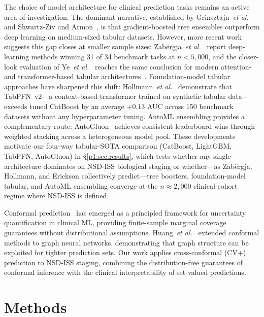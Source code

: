 The choice of model architecture for clinical prediction tasks remains an active area of investigation. The dominant narrative, established by Grinsztajn~\textit{et al.}~\cite{grinsztajn2022} and Shwartz-Ziv and Armon~\cite{shwartzziv2022}, is that gradient-boosted tree ensembles outperform deep learning on medium-sized tabular datasets. However, more recent work suggests this gap closes at smaller sample sizes: Zab\"{e}rgja~\textit{et al.}~\cite{zabergja2024dltabular} report deep-learning methods winning 31 of 34 benchmark tasks at $n < 5{,}000$, and the closer-look evaluation of Ye~\textit{et al.}~\cite{ye2024closertabular} reaches the same conclusion for modern attention- and transformer-based tabular architectures~\cite{gorishniy2021revisiting}. Foundation-model tabular approaches have sharpened this shift: Hollmann~\textit{et al.}~\cite{hollmann2025tabpfn} demonstrate that TabPFN~v2---a context-based transformer trained on synthetic tabular data---exceeds tuned CatBoost by an average $+0.13$ AUC across 150 benchmark datasets without any hyperparameter tuning. AutoML ensembling provides a complementary route: AutoGluon~\cite{erickson2020autogluon} achieves consistent leaderboard wins through weighted stacking across a heterogeneous model pool. These developments motivate our four-way tabular-SOTA comparison (CatBoost, LightGBM, TabPFN, AutoGluon) in \S\ref{p1:sec:results}, which tests whether any single architecture dominates on NSD-ISS biological staging or whether---as Zab\"{e}rgja, Hollmann, and Erickson collectively predict---tree boosters, foundation-model tabular, and AutoML ensembling converge at the $n \approx 2{,}000$ clinical-cohort regime where NSD-ISS is defined.

Conformal prediction~\cite{vovk2022} has emerged as a principled framework for uncertainty quantification in clinical ML, providing finite-sample marginal coverage guarantees without distributional assumptions. Huang~\textit{et al.}~\cite{huang2023} extended conformal methods to graph neural networks, demonstrating that graph structure can be exploited for tighter prediction sets. Our work applies cross-conformal (CV+) prediction to NSD-ISS staging, combining the distribution-free guarantees of conformal inference with the clinical interpretability of set-valued predictions.

\section{Methods}
\label{p1:sec:methods}

